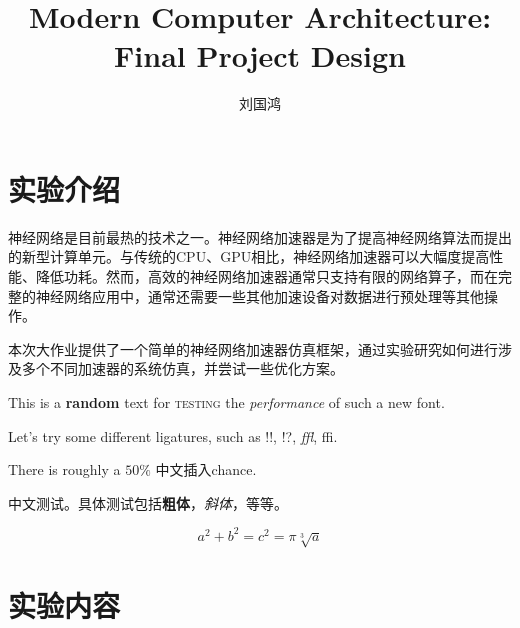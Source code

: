 \documentclass{TexHU}
\title{Modern Computer Architecture: Final Project Design}
\author{刘国鸿}
\begin{document}
\maketitle
\section*{实验介绍}

神经网络是目前最热的技术之一。神经网络加速器是为了提高神经网络算法而提出的新型计算单元。与传统的CPU、GPU相比，神经网络加速器可以大幅度提高性能、降低功耗。然而，高效的神经网络加速器通常只支持有限的网络算子，而在完整的神经网络应用中，通常还需要一些其他加速设备对数据进行预处理等其他操作。

本次大作业提供了一个简单的神经网络加速器仿真框架，通过实验研究如何进行涉及多个不同加速器的系统仿真，并尝试一些优化方案。


This is a \textbf{random} text for \textsc{testing} the \textit{performance} of such a new font.

Let's try some different ligatures, such as !!, !?, \textit{ffl}, ffi.

There is roughly a \(50\%\) 中文插入chance.

中文测试。具体测试包括\textbf{粗体}，\textit{斜体}，等等。

\[a^2+b^2=c^2=\pi\sqrt[3]{a}\]

\sectionDivider
\section*{实验内容}
\end{document}
